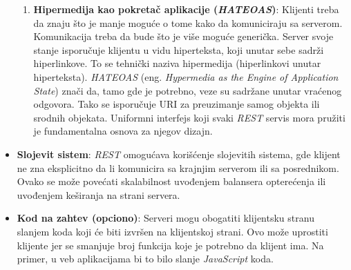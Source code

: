 \begin{itemize}
\begin{enumerate}
        \item \textbf{Hipermedija kao pokretač aplikacije (\textit{HATEOAS})}:
        Klijenti treba da znaju što je manje moguće o tome kako da komuniciraju sa serverom. Komunikacija treba da bude
        što je više moguće generička. Server svoje stanje isporučuje klijentu u vidu hiperteksta, koji unutar sebe 
        sadrži hiperlinkove. To se tehnički naziva hipermedija (hiperlinkovi unutar hiperteksta). 
        \textit{HATEOAS} (eng. \textit{Hypermedia as the Engine of Application State}) 
        znači da, tamo gde je potrebno, veze su sadržane unutar vraćenog odgovora. 
        Tako se isporučuje URI za preuzimanje samog objekta ili srodnih 
        objekata. Uniformni interfejs koji svaki \textit{REST} servis mora pružiti je fundamentalna 
        osnova za njegov dizajn.
        
        
    \end{enumerate}
    
	\item \textbf{Slojevit sistem}: \textit{REST} omogućava korišćenje slojevitih sistema, gde klijent ne zna 
    eksplicitno da li komunicira sa krajnjim serverom ili sa posrednikom. Ovako se može povećati 
    skalabilnost uvođenjem balansera opterećenja ili uvođenjem keširanja na strani servera. 
	
	\item \textbf{Kod na zahtev (opciono)}: Serveri mogu obogatiti klijentsku stranu slanjem koda koji će biti izvršen na 
	klijentskoj strani. Ovo može uprostiti klijente jer se smanjuje broj funkcija koje je potrebno da 
    klijent ima. Na primer, u veb aplikacijama bi to bilo slanje \textit{JavaScript} koda. 

\end{itemize}


